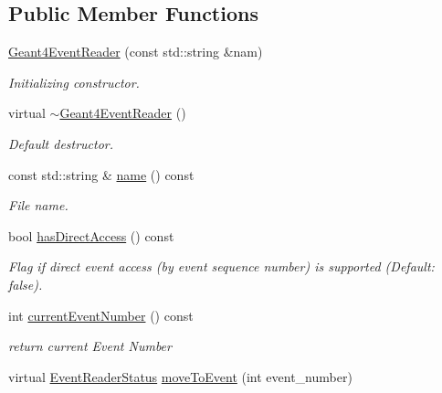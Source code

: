 \subsection*{Public Member Functions}
\begin{DoxyCompactItemize}
\item 
\hyperlink{class_d_d4hep_1_1_simulation_1_1_geant4_event_reader_abf6dc1e6d792edd26889a527310054f0}{Geant4EventReader} (const std::string \&nam)
\begin{DoxyCompactList}\small\item\em Initializing constructor. \item\end{DoxyCompactList}\item 
virtual \hyperlink{class_d_d4hep_1_1_simulation_1_1_geant4_event_reader_a79666927f8c31df30ceb03ea5f1c7b12}{$\sim$Geant4EventReader} ()
\begin{DoxyCompactList}\small\item\em Default destructor. \item\end{DoxyCompactList}\item 
const std::string \& \hyperlink{class_d_d4hep_1_1_simulation_1_1_geant4_event_reader_adc07fc968ac88303779f1ff633bfe254}{name} () const 
\begin{DoxyCompactList}\small\item\em File name. \item\end{DoxyCompactList}\item 
bool \hyperlink{class_d_d4hep_1_1_simulation_1_1_geant4_event_reader_a8039cf3c772b47f4eae5371c1e9feac6}{hasDirectAccess} () const 
\begin{DoxyCompactList}\small\item\em Flag if direct event access (by event sequence number) is supported (Default: false). \item\end{DoxyCompactList}\item 
int \hyperlink{class_d_d4hep_1_1_simulation_1_1_geant4_event_reader_a93fe463e06cf484be423158d6536d820}{currentEventNumber} () const 
\begin{DoxyCompactList}\small\item\em return current Event Number \item\end{DoxyCompactList}\item 
virtual \hyperlink{class_d_d4hep_1_1_simulation_1_1_geant4_event_reader_ae4f4bc83ffcf5b0c1868ad78859851e7}{EventReaderStatus} \hyperlink{class_d_d4hep_1_1_simulation_1_1_geant4_event_reader_a0b6d2fe12ae259534cbe7a5b6e35b642}{moveToEvent} (int event\_\-number)

\end{DoxyCompactItemize}

